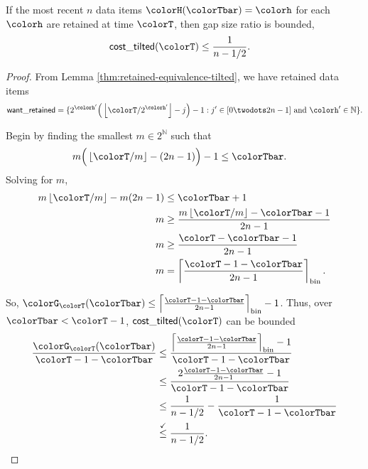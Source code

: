 \begin{lemma}
\label{thm:gap-size-ratio-tilted}
If the most recent $n$ data items $\colorH(\colorTbar) = \colorh$ for each \hv{} $\colorh$ are retained at time $\colorT$, then gap size ratio is bounded,
\begin{align*}
\mathsf{cost\_tilted}(\colorT)
&\leq
\frac{1}{n - 1/2}.
\end{align*}
\end{lemma}
\begin{proof}

From Lemma \ref{thm:retained-equivalence-tilted}, we have retained data items
\begin{align*}
\mathsf{want\_retained} =
\{
2^{\colorh'}\Big(\left\lfloor \colorT / 2^{\colorh'} \right\rfloor - j\Big) - 1
  :
  j' \in [0 \twodots 2n-1]
  \text{ and }
  \colorh' \in \mathbb{N}
\}.
\end{align*}

Begin by finding the smallest $m \in 2^{\mathbb{N}}$ such that
\begin{align*}
m\Big( \left\lfloor \colorT /m \right\rfloor - (2n - 1)\Big) - 1
&\leq
\colorTbar.
\end{align*}
Solving for $m$,
\begin{align*}
m \left\lfloor \colorT/m \right\rfloor - m(2n - 1)
&\leq \colorTbar + 1\\
m
&\geq \frac{
m \left\lfloor \colorT/m \right\rfloor - \colorTbar - 1
}{2n - 1}\\
m
&\geq \frac{
\colorT - \colorTbar - 1
}{2n - 1}\\
m
&= \left\lceil \frac{\colorT - 1 - \colorTbar}{2n - 1} \right\rceil_{\mathrm{bin}}.
\end{align*}

So, $\colorG_{\colorT}(\colorTbar) \leq \left\lceil \frac{\colorT - 1 - \colorTbar}{2n - 1} \right\rceil_{\mathrm{bin}} - 1$.
Thus, over $\colorTbar < \colorT - 1$, $\mathsf{cost\_tilted}(\colorT)$ can be bounded
\begin{align*}
\frac{\colorG_{\colorT}(\colorTbar)}{\colorT - 1 - \colorTbar}
&\leq
\frac{
\left\lceil \frac{\colorT - 1 - \colorTbar}{2n - 1} \right\rceil_{\mathrm{bin}} - 1
}{
\colorT - 1 - \colorTbar
}\\
&\leq
\frac{
2\frac{\colorT - 1 - \colorTbar}{2n - 1}
 - 1
}{
\colorT - 1 - \colorTbar
}\\
&\leq
\frac{1
}{n - 1/2}
-
\frac{1
}{
\colorT - 1 - \colorTbar
}\\
&\stackrel{\checkmark}{\leq}
\frac{1}{n - 1/2}.
\end{align*}

\end{proof}
